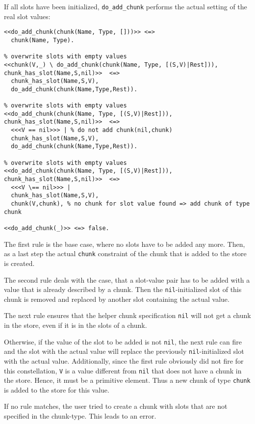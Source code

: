 If all slots have been initialized, \verb|do_add_chunk| performs the actual setting of the real slot values:
  
\begin{lstlisting}[caption={Additional rules for adding chunks}]  
% base case
<<do_add_chunk(chunk(Name, Type, []))>> <=> 
  chunk(Name, Type). 

% overwrite slots with empty values
<<chunk(V,_) \ do_add_chunk(chunk(Name, Type, [(S,V)|Rest])), chunk_has_slot(Name,S,nil)>>  <=>
  chunk_has_slot(Name,S,V), 
  do_add_chunk(chunk(Name,Type,Rest)).

% overwrite slots with empty values  
<<do_add_chunk(chunk(Name, Type, [(S,V)|Rest])), chunk_has_slot(Name,S,nil)>>  <=> 
  <<<V == nil>>> | % do not add chunk(nil,chunk)
  chunk_has_slot(Name,S,V), 
  do_add_chunk(chunk(Name,Type,Rest)).  

% overwrite slots with empty values  
<<do_add_chunk(chunk(Name, Type, [(S,V)|Rest])), chunk_has_slot(Name,S,nil)>>  <=> 
  <<<V \== nil>>> |
  chunk_has_slot(Name,S,V), 
  chunk(V,chunk), % no chunk for slot value found => add chunk of type chunk 
  
<<do_add_chunk(_)>> <=> false.
\end{lstlisting}

The first rule is the base case, where no slots have to be added any more. Then, as a last step the actual \verb|chunk| constraint of the chunk that is added to the store is created.

The second rule deals with the case, that a slot-value pair has to be added with a value that is already described by a chunk. Then the \verb|nil|-initialized slot of this chunk is removed and replaced by another slot containing the actual value.

The next rule ensures that the helper chunk specification \verb|nil| will not get a chunk in the store, even if it is in the slots of a chunk.

Otherwise, if the value of the slot to be added is not \verb|nil|, the next rule can fire and the slot with the actual value will replace the previously \verb|nil|-initialized slot with the actual value. Additionally, since the first rule obviously did not fire for this constellation, \verb|V| is a value different from \verb|nil| that does not have a chunk in the store. Hence, it must be a primitive element. Thus a new chunk of type \verb|chunk| is added to the store for this value.

If no rule matches, the user tried to create a chunk with slots that are not specified in the chunk-type. This leads to an error.

